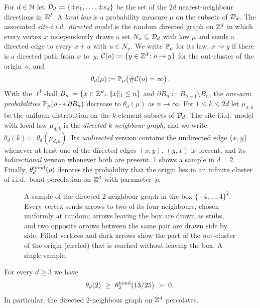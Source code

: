 \documentclass[11pt,letterpaper]{article}
\begin{document}
For $d\in\N$ let $\cD_d\coloneqq\{\pm e_1,\dots,\pm e_d\}$ be the set of the $2d$ nearest-neighbour directions in $\Z^d$. A \emph{local law} is a probability measure $\mu$ on the subsets of $\cD_d$. The associated \emph{site-i.i.d.\ directed model} is the random directed graph on $\Z^d$ in which every vertex $x$ independently draws a set $N_x\subseteq\cD_d$ with law $\mu$ and sends a directed edge to every $x+u$ with $u\in N_x$. We write $\P_\mu$ for its law, $x\rightsquigarrow y$ if there is a directed path from $x$ to~$y$, $\cC(o)\coloneqq\{y\in\Z^d\colon o\rightsquigarrow y\}$ for the out-cluster of the origin~$o$, and
\begin{equation*}
\theta_d(\mu)\coloneqq\P_\mu\big(\#\cC(o)=\infty\big)\,.
\end{equation*}
With the $\ell^1$-ball $B_n\coloneqq\{x\in\Z^d\colon\|x\|_1\le n\}$ and $\partial B_n\coloneqq B_{n+1}\setminus B_n$, the \emph{one-arm probabilities} $\P_\mu(o\rightsquigarrow\partial B_n)$ decrease to $\theta_d(\mu)$ as $n\to\infty$. For $1\le k\le 2d$ let $\mu_{d,k}$ be the uniform distribution on the $k$-element subsets of $\cD_d$. The site-i.i.d.\ model with local law $\mu_{d,k}$ is the \emph{directed $k$-neighbour graph}, and we write $\theta_d(k)\coloneqq\theta_d(\mu_{d,k})$. Its \emph{undirected} version contains the undirected edge $\{x,y\}$ whenever at least one of the directed edges $(x,y)$, $(y,x)$ is present, and its \emph{bidirectional} version whenever both are present. \cref{fig:model} shows a sample in $d=2$. Finally, $\theta^\bond_d(p)$ denotes the probability that the origin lies in an infinite cluster of i.i.d.\ bond percolation on $\Z^d$ with parameter~$p$.

\begin{figure}[!htb]
\centering
\begin{tikzpicture}[scale=0.62]

\end{tikzpicture}
\caption{A sample of the directed $2$-neighbour graph in the box $\{-4,\dots,4\}^2$. Every vertex sends arrows to two of its four neighbours, chosen uniformly at random; arrows leaving the box are drawn as stubs, and two opposite arrows between the same pair are drawn side by side. Filled vertices and dark arrows show the part of the out-cluster of the origin (circled) that is reached without leaving the box. A single sample.}
\label{fig:model}
\end{figure}

\begin{theorem}\label{thm:main}
For every $d\ge3$ we have
\begin{equation*}
\theta_d(2)\ \ge\ \theta^\bond_2(13/25)\ >\ 0\,.
\end{equation*}
In particular, the directed $2$-neighbour graph on $\Z^d$ percolates.
\end{theorem}
\end{document}
